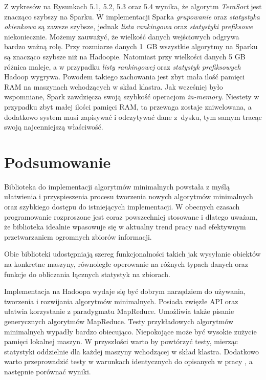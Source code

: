 \documentclass[magisterska]{pracamgr}
\begin{document}
\newpage
Z wykresów na Rysunkach 5.1, 5.2, 5.3 oraz 5.4 wynika, że algorytm \textit{TeraSort} jest znacząco szybszy na Sparku. W implementacji Sparka \textit{grupowanie} oraz \textit{statystyka okienkowa} są zawsze szybsze, jednak \textit{lista rankingowa} oraz \textit{statystyki prefiksowe} niekoniecznie. Możemy zauważyć, że wielkość danych wejściowych odgrywa bardzo ważną rolę. Przy rozmiarze danych \mbox{1 GB} wszystkie algorytmy na Sparku są znacząco szybsze niż na Hadoopie. Natomiast przy wielkości danych 5 GB różnica maleje, a w przypadku \textit{listy rankingowej} oraz \textit{statystyk prefiksowych} Hadoop wygrywa. Powodem takiego zachowania jest zbyt mała ilość pamięci RAM na maszynach wchodzących w skład klastra. Jak wcześniej było wspomniane, Spark zawdzięcza swoją szybkość operacjom \textit{in-memory}. Niestety w przypadku zbyt małej ilości pamięci RAM, ta przewaga zostaje zniwelowana, a dodatkowo system musi zapisywać i odczytywać dane z~dysku, tym samym tracąc swoją najcenniejszą właściwość.

\chapter{Podsumowanie}
\setlength{\parindent}{6.5ex}

Biblioteka do implementacji algorytmów minimalnych powstała z myślą ułatwienia i przyspieszenia procesu tworzenia nowych algorytmów minimalnych oraz szybkiego dostępu do istniejących implementacji. W obecnych czasach programowanie rozproszone jest coraz powszechniej stosowane i dlatego uważam, że biblioteka idealnie wpasowuje się w aktualny trend pracy nad efektywnym przetwarzaniem ogromnych zbiorów informacji.

Obie biblioteki udostępniają szereg funkcjonalności takich jak wysyłanie obiektów na konkretne maszyny, równoległe operowanie na różnych typach danych oraz funkcje do obliczania łącznych statystyk na zbiorach.

Implementacja na Hadoopa wydaje się być dobrym narzędziem do używania, tworzenia i rozwijania algorytmów minimalnych. Posiada zwięzłe API oraz ułatwia korzystanie z paradygmatu MapReduce. Umożliwia także pisanie generycznych algorytmów MapReduce. Testy przykładowych algorytmów minimalnych wypadły bardzo obiecująco. Niepokojące może być wysokie zużycie pamięci lokalnej maszyn. W przyszłości warto by powtórzyć testy, mierząc statystyki oddzielnie dla każdej maszyny wchodzącej w skład klastra. Dodatkowo warto przeprowadzić testy w warunkach identycznych do opisanych w pracy \cite{tao2013minimal}, a następnie porównać wyniki.
\end{document}
